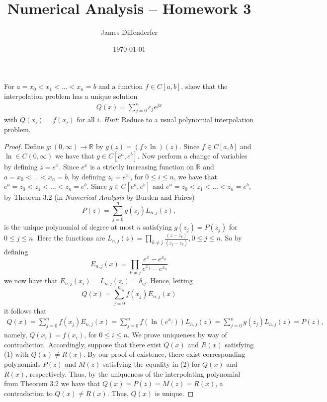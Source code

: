 \documentclass[8pt]{article}
\title{Numerical Analysis -- Homework 3}
\author{James Diffenderfer}
\date{\today}
\theoremstyle{definition}
\newenvironment{exercise}[1]
  {\renewcommand\theinnerexercise{#1}\innerexercise}
  {\endinnerexercise}
\begin{document}
\maketitle


\begin{exercise}{1}
For $a = x_0 < x_1 < \ldots < x_n = b$ and a function $f \in C[a,b]$, show that the interpolation problem has a unique solution 
\begin{align}
Q(x) = \sum_{j = 0}^{n} c_j e^{j x}
\end{align}
with $Q(x_i) = f(x_i)$ for all $i$. \emph{Hint}: Reduce to a usual polynomial interpolation problem.
\end{exercise}

\begin{proof}
Define $g : (0, \infty) \to \mathbb{R}$ by $g (z) = (f \circ \ln) (z)$. Since $f \in C [a, b]$ and $\ln \in C(0, \infty)$ we have that $g \in C [e^a, e^b]$. Now perform a change of variables by defining $z = e^x$. Since $e^x$ is a strictly increasing function on $\mathbb{R}$ and $a = x_0 < \ldots < x_n = b$, by defining $z_i = e^{x_i}$, for $0 \leq i \leq n$, we have that $e^a = z_0 < z_1 < \ldots < z_n = e^b$.  Since $g \in C [e^a, e^b]$ and $e^a = z_0 < z_1 < \ldots < z_n = e^b$, by Theorem 3.2 (in \emph{Numerical Analysis} by Burden and Faires) $$P(z) = \sum_{j = 0}^{n} g(z_j) L_{n, j} (z),$$ is the unique polynomial of degree at most $n$ satisfying $g(z_j) = P(z_j)$ for $0 \leq j \leq n$. Here the functions are $L_{n, j} (z) = \prod_{k \neq j} \frac{(z - z_k)}{(z_j - z_k)}, 0 \leq j \leq n$. So by defining $$E_{n, j} (x) = \prod_{k \neq j} \frac{e^x - e^{x_k}}{e^{x_j} - e^{x_k}}$$ we now have that $E_{n, j} (x_i) = L_{n, j} (z_i) = \delta_{ij}$. Hence, letting $$Q(x) = \sum_{j = 0}^{n} f(x_j) E_{n, j} (x)$$ it follows that 
\begin{align}
Q(x) = \sum_{j = 0}^{n} f(x_j) E_{n, j} (x) = \sum_{j = 0}^{n} f(\ln (e^{x_j})) L_{n, j} (z) = \sum_{j = 0}^{n} g (z_j) L_{n, j} (z)= P(z),
\end{align}
namely, $Q(x_i) = f(x_i)$, for $0 \leq i \leq n$. We prove uniqueness by way of contradiction. Accordingly, suppose that there exist $Q (x)$ and $R(x)$ satisfying (1) with $Q(x) \neq R(x)$. By our proof of existence, there exist corresponding polynomials $P(z)$ and $M(z)$ satisfying the equality in (2) for $Q(x)$ and $R(x)$, respectively. Thus, by the uniqueness of the interpolating polynomial from Theorem 3.2 we have that $Q(x) = P(z) = M(z) = R(x)$, a contradiction to $Q(x) \neq R(x)$. Thus, $Q(x)$ is unique.
\end{proof}
\end{document}

